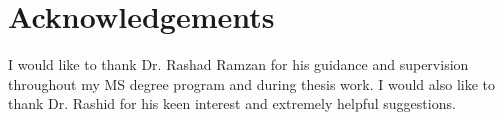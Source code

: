 

\chapter*{Acknowledgements}

I would like to thank Dr. Rashad Ramzan for his guidance and supervision throughout
my MS degree program and during thesis work. I would also like to thank Dr. Rashid
for his keen interest and extremely helpful suggestions.

\vfill
\noindent
